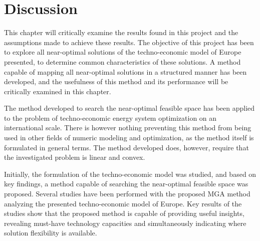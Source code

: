 
\chapter{Discussion}

%

This chapter will critically examine the results found in this project and the assumptions made to achieve these results. The objective of this project has been to explore all near-optimal solutions of the techno-economic model of Europe presented, to determine common characteristics of these solutions. A method capable of mapping all near-optimal solutions in a structured manner has been developed, and the usefulness of this method and its performance will be critically examined in this chapter. 

The method developed to search the near-optimal feasible space has been applied to the problem of techno-economic energy system optimization on an international scale. There is however nothing preventing this method from being used in other fields of numeric modeling and optimization, as the method itself is formulated in general terms. The method developed does, however, require that the investigated problem is linear and convex. 

Initially, the formulation of the techno-economic model was studied, and based on key findings, a method capable of searching the near-optimal feasible space was proposed. Several studies have been performed with the proposed MGA method analyzing the presented techno-economic model of Europe. Key results of the studies show that the proposed method is capable of providing useful insights, revealing must-have technology capacities and simultaneously indicating where solution flexibility is available.

